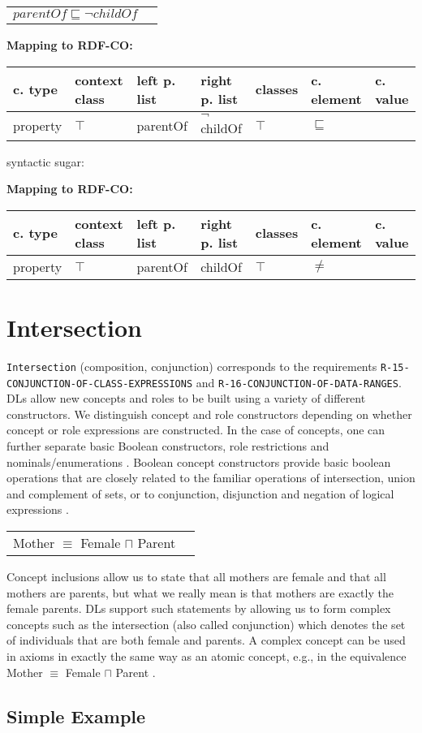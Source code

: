 \documentclass{llncs}
\newcommand{\ms}[1]{\texttt{#1}}
\newenvironment{gcotable}{
  \scriptsize
  \sffamily
  \vspace{0cm}
	\begin{center}
	\textbf{\vspace{0.4cm}Mapping to RDF-CO:} \\
  \begin{tabular}{l|l|l|l|l|l|l}
	\hline
  \textbf{c. type} & \textbf{context class} & \textbf{left p. list} & \textbf{right p. list} & \textbf{classes} & \textbf{c. element} & \textbf{c. value} \\
  \hline

}{
  \hline
  \end{tabular}
	\end{center}
}
\newenvironment{DL}{
  \vspace{0cm}
	\begin{center}
  \begin{tabular}{r l}

}{
  \end{tabular}
	\end{center}
}
\begin{document}
\begin{DL}
$parentOf \sqsubseteq \neg childOf$
\end{DL}

\begin{gcotable}
property & $\top$ & parentOf & $\neg$childOf & $\top$ & $\sqsubseteq$ \\
\end{gcotable}

syntactic sugar:

\begin{gcotable}
property & $\top$ & parentOf & childOf & $\top$ & $\ne$ \\
\end{gcotable}

\section{Intersection}

\ms{Intersection} (composition, conjunction) corresponds to the requirements \ms{R-15-CONJUNCTION-OF-CLASS-EXPRESSIONS} and \ms{R-16-CONJUNCTION-OF-DATA-RANGES}.
DLs allow new concepts and roles to be
built using a variety of different constructors. We distinguish concept and role 
constructors depending on whether concept or role expressions are constructed. In the case of
concepts, one can further separate basic Boolean constructors, role restrictions and nominals/enumerations \cite{Kroetzsch2012}.
Boolean concept constructors provide basic boolean operations that are closely related to
the familiar operations of intersection, union and complement of sets, or to conjunction,
disjunction and negation of logical expressions \cite{Kroetzsch2012}.

\begin{DL}
Mother $\equiv$ Female $\sqcap$ Parent
\end{DL}

Concept inclusions allow us to state that all mothers are female and that
all mothers are parents, but what we really mean is that mothers are exactly the female
parents. DLs support such statements by allowing us to form complex concepts such as
the intersection (also called conjunction)
which denotes the set of individuals that are both female and parents. A complex concept
can be used in axioms in exactly the same way as an atomic concept, e.g., in the
equivalence Mother $\equiv$ Female $\sqcap$ Parent .

\subsection{Simple Example}
\end{document}
